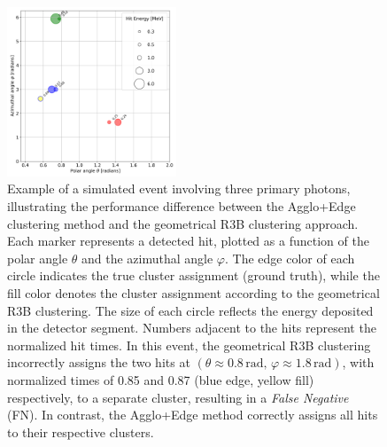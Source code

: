 \documentclass[review,sort&compress]{elsarticle}
\begin{document}
\begin{figure}[!htb]
        \centering
        \includegraphics[width=0.45\textwidth]{fig3.png}

		\caption{
		Example of a simulated event involving three primary photons, illustrating the performance difference between the Agglo+Edge clustering method and the geometrical R3B clustering approach. Each marker represents a detected hit, plotted as a function of the polar angle  \(\theta\) and the azimuthal angle \(\varphi\). The edge color of each circle indicates the true cluster assignment (ground truth), while the fill color denotes the cluster assignment according to the geometrical R3B clustering. The size of each circle reflects the energy deposited in the detector segment. Numbers adjacent to the hits represent the normalized hit times. In this event, the geometrical R3B clustering incorrectly assigns the two hits at \((\theta \approx 0.8\,\mathrm{rad},\, \varphi \approx 1.8\,\mathrm{rad})\), with normalized times of 0.85 and 0.87 (blue edge, yellow fill) respectively, to a separate cluster, resulting in a \textit{False Negative} (FN). In contrast, the Agglo+Edge method correctly assigns all hits to their respective clusters.
		}

        \label{fig:comparison_r3b_agglo_edge}%
\end{figure}
\end{document}
